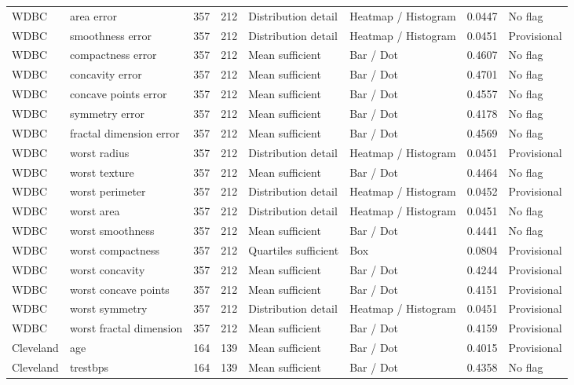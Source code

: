 \begin{longtable}{>{\raggedright\arraybackslash}p{2.5cm}>{\raggedright\arraybackslash}p{4.5cm}rr>{\raggedright\arraybackslash}p{3.0cm}>{\raggedright\arraybackslash}p{4.0cm}rp{2.0cm}}
WDBC\cite{wdbc} & area error & 357 & 212 & Distribution detail & Heatmap / Histogram & 0.0447 & No flag\\
WDBC\cite{wdbc} & smoothness error & 357 & 212 & Distribution detail & Heatmap / Histogram & 0.0451 & Provisional\\
WDBC\cite{wdbc} & compactness error & 357 & 212 & Mean sufficient & Bar / Dot & 0.4607 & No flag\\
WDBC\cite{wdbc} & concavity error & 357 & 212 & Mean sufficient & Bar / Dot & 0.4701 & No flag\\
WDBC\cite{wdbc} & concave points error & 357 & 212 & Mean sufficient & Bar / Dot & 0.4557 & No flag\\
WDBC\cite{wdbc} & symmetry error & 357 & 212 & Mean sufficient & Bar / Dot & 0.4178 & No flag\\
WDBC\cite{wdbc} & fractal dimension error & 357 & 212 & Mean sufficient & Bar / Dot & 0.4569 & No flag\\
WDBC\cite{wdbc} & worst radius & 357 & 212 & Distribution detail & Heatmap / Histogram & 0.0451 & Provisional\\
WDBC\cite{wdbc} & worst texture & 357 & 212 & Mean sufficient & Bar / Dot & 0.4464 & No flag\\
WDBC\cite{wdbc} & worst perimeter & 357 & 212 & Distribution detail & Heatmap / Histogram & 0.0452 & Provisional\\
WDBC\cite{wdbc} & worst area & 357 & 212 & Distribution detail & Heatmap / Histogram & 0.0451 & No flag\\
WDBC\cite{wdbc} & worst smoothness & 357 & 212 & Mean sufficient & Bar / Dot & 0.4441 & No flag\\
WDBC\cite{wdbc} & worst compactness & 357 & 212 & Quartiles sufficient & Box & 0.0804 & Provisional\\
WDBC\cite{wdbc} & worst concavity & 357 & 212 & Mean sufficient & Bar / Dot & 0.4244 & Provisional\\
WDBC\cite{wdbc} & worst concave points & 357 & 212 & Mean sufficient & Bar / Dot & 0.4151 & Provisional\\
WDBC\cite{wdbc} & worst symmetry & 357 & 212 & Distribution detail & Heatmap / Histogram & 0.0451 & Provisional\\
WDBC\cite{wdbc} & worst fractal dimension & 357 & 212 & Mean sufficient & Bar / Dot & 0.4159 & Provisional\\
Cleveland\cite{heart} & age & 164 & 139 & Mean sufficient & Bar / Dot & 0.4015 & Provisional\\
Cleveland\cite{heart} & trestbps & 164 & 139 & Mean sufficient & Bar / Dot & 0.4358 & No flag\\

\end{longtable}

